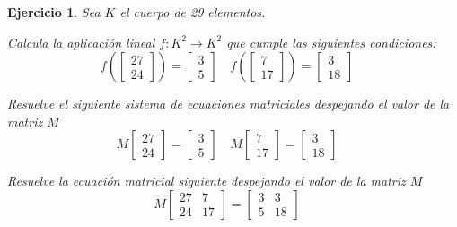 \documentclass[12pt]{amsart}
\newtheorem{ejer}{Ejercicio}
\begin{document}
\begin{ejer} Sea $K$ el cuerpo de 29 elementos.
\newline
\noindent\begin{minipage}{\textwidth}
\begin{tcolorbox}[colback = green!20!white,title=Versión Aplicación]
Calcula la aplicaci\'on lineal $f:K^{2} \to K^{2}$ que cumple las siguientes condiciones: 
\[f\left(\left[\begin{array}{r}
27 \\
24
\end{array}\right]\right) = \left[\begin{array}{r}
3 \\
5
\end{array}\right] \quad f\left(\left[\begin{array}{r}
7 \\
17
\end{array}\right]\right) = \left[\begin{array}{r}
3 \\
18
\end{array}\right] \quad 
\]\end{tcolorbox}
\end{minipage} \newline
\noindent\begin{minipage}{\textwidth}
\begin{tcolorbox}[colback = blue!20!white,title=Versión Sistema Matricial]
Resuelve el siguiente sistema de ecuaciones matriciales despejando el valor de la matriz $M$
\[M \left[\begin{array}{r}
27 \\
24
\end{array}\right] = \left[\begin{array}{r}
3 \\
5
\end{array}\right] \quad M \left[\begin{array}{r}
7 \\
17
\end{array}\right] = \left[\begin{array}{r}
3 \\
18
\end{array}\right] \quad 
\]\end{tcolorbox}
\end{minipage} \newline
\noindent\begin{minipage}{\textwidth} 
\begin{tcolorbox}[colback = red!20!white,title=Versión Ecuación Matricial]
Resuelve la ecuación matricial siguiente despejando el valor de la matriz $M$
\[M \left[\begin{array}{rr}
27 & 7 \\
24 & 17
\end{array}\right] = \left[\begin{array}{rr}
3 & 3 \\
5 & 18
\end{array}\right] \quad 
\]
\end{tcolorbox}
\end{minipage}%
\end{ejer}
\end{document}
